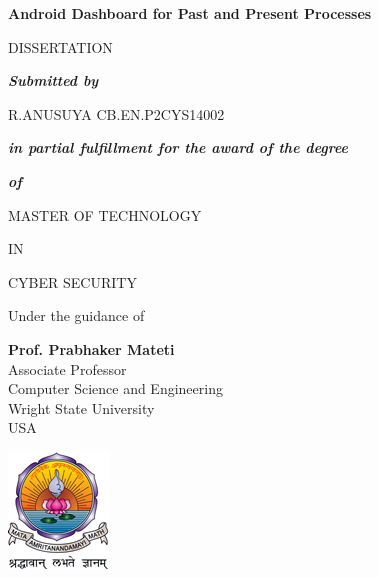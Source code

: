 \documentclass[12pt]{report}
\begin{document}


\clearpage





\begin{center}
	\Large
	\textbf{Android Dashboard for Past and Present Processes}
	
	\vspace*{22pt}
	\normalsize
	DISSERTATION
	
	\vspace*{12pt}
	\textbf{\textit{Submitted by}}
	
	\vspace*{12pt}
	\begin{flushleft}
		\hspace*{100pt}
		\large
		R.ANUSUYA
		\hspace*{2pt}
		\large
		CB.EN.P2CYS14002
	\end{flushleft}
	
	\vspace*{12pt}
	\normalsize
	\textit{\textbf{in partial fulfillment for the award of the degree}}
	
	\textbf{\textit{of}}
	
	
	\vspace*{22pt}
	MASTER OF TECHNOLOGY
	
	IN
	
	CYBER SECURITY
	
	\vspace*{22pt}
	Under the guidance of
	
	\vspace*{12pt}
	\textbf{Prof. Prabhaker Mateti}\\Associate Professor\\ Computer Science and Engineering\\Wright State University\\USA
	
	\vspace*{22pt}
	\includegraphics[keepaspectratio=true]{avvp_logo1}
	

\end{center}
\end{document}
